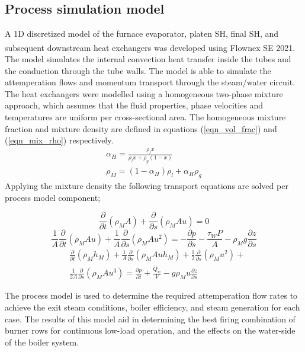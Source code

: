 \documentclass[twocolumn,10pt]{asme2ej}
\begin{document}
\subsection{Process simulation model}
A 1D discretized model of the furnace evaporator, platen SH, final SH, and subsequent downstream heat exchangers was developed using Flownex SE\textsuperscript{\textregistered} 2021. The model simulates the internal convection heat transfer inside the tubes and the conduction through the tube walls. The model is able to simulate the attemperation flows and momentum transport through the steam/water circuit. The heat exchangers were modelled using a homogeneous two-phase mixture approach, which assumes that the fluid properties, phase velocities and temperatures are uniform per cross-sectional area. The homogeneous mixture fraction and mixture density are defined in equations (\ref{eqn_vol_frac}) and (\ref{eqn_mix_rho}) respectively.
\begin{gather}
\alpha_H = \frac{\rho_l x}{\rho_lx + \rho_g(1-x)} \label{eqn_vol_frac}\\  
\rho_M = (1-\alpha_H)\rho_l + \alpha_H\rho_g \label{eqn_mix_rho}
\end{gather}
Applying the mixture density the following transport equations are solved per process model component;

\begin{equation}\label{eqn_mix_conti}
\frac{\partial}{\partial t}(\rho_M A)+\frac{\partial}{\partial s}(\rho_MAu) = 0
\end{equation}
\begin{equation}\label{eqn_mix_mom}
\frac{1}{A} \frac{\partial}{\partial t}(\rho_M A u)+\frac{1}{A} \frac{\partial}{\partial s}(\rho_M A u^2) = -\frac{\partial p}{\partial s}-\frac{\tau_W P}{A}- \rho_M g \frac{\partial z}{\partial s}
\end{equation}
\begin{equation}\label{eqn_mix_energy}
\begin{split}
&\frac{\partial}{\partial t}(\rho_Mh_M)+\frac{1}{A}\frac{\partial}{\partial s}(\rho_MAuh_M)+\frac{1}{2}\frac{\partial}{\partial s}(\rho_Mu^2)+\\
&\frac{1}{2A}\frac{\partial}{\partial s}(\rho_MAu^3)=\frac{\partial p}{\partial t} + \frac{\dot{Q}_w}{V}-g\rho_Mu\frac{\partial z}{\partial s}
\end{split}
\end{equation}

The process model is used to determine the required attemperation flow rates to achieve the exit steam conditions, boiler efficiency, and steam generation for each case. The results of this model aid in determining the best firing combination of burner rows for continuous low-load operation, and the effects on the water-side of the boiler system.
\end{document}

